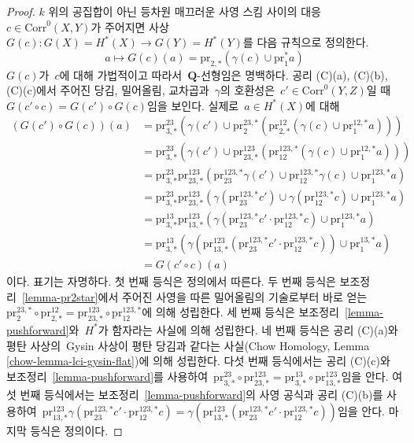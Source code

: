 \begin{proof}
\medskip\noindent
$k$ 위의 공집합이 아닌 등차원 매끄러운 사영 스킴 사이의 대응\ 
$c \in \text{Corr}^0(X, Y)$가 주어지면 사상\ 
$G(c) : G(X) = H^*(X) \to G(Y) = H^*(Y)$를 다음 규칙으로 정의한다.
$$
a \longmapsto
G(c)(a) = \text{pr}_{2, *}(\gamma(c) \cup \text{pr}_1^*a)
$$
$G(c)$가\  $c$에 대해 가법적이고 따라서\  $\mathbf{Q}$-선형임은 명백하다.
공리 (C)(a), (C)(b), (C)(c)에서 주어진 당김, 밀어올림, 교차곱과\ 
$\gamma$의 호환성은\  $c' \in \text{Corr}^0(Y, Z)$일 때\ 
$G(c' \circ c) = G(c') \circ G(c)$임을 보인다. 실제로\ 
$a \in H^*(X)$에 대해
\begin{align*}
(G(c') \circ G(c))(a)
& =
\text{pr}^{23}_{3, *}(\gamma(c') \cup
\text{pr}^{23, *}_2(\text{pr}^{12}_{2, *}(\gamma(c) \cup
\text{pr}^{12, *}_1a))) \\
& =
\text{pr}^{23}_{3, *}(\gamma(c') \cup
\text{pr}^{123}_{23, *}(\text{pr}^{123, *}_{12}(\gamma(c) \cup
\text{pr}^{12, *}_1 a))) \\
& =
\text{pr}^{23}_{3, *}
\text{pr}^{123}_{23, *}(
\text{pr}^{123, *}_{23}\gamma(c') \cup
\text{pr}^{123, *}_{12}\gamma(c) \cup
\text{pr}^{123, *}_1 a) \\
& =
\text{pr}^{23}_{3, *}
\text{pr}^{123}_{23, *}(
\gamma(\text{pr}^{123, *}_{23}c') \cup
\gamma(\text{pr}^{123, *}_{12}c) \cup
\text{pr}^{123, *}_1 a) \\
& =
\text{pr}^{13}_{3, *}
\text{pr}^{123}_{13, *}(
\gamma(\text{pr}^{123, *}_{23}c' \cdot \text{pr}^{123, *}_{12}c) \cup
\text{pr}^{123, *}_1 a) \\
& =
\text{pr}^{13}_{3, *}(
\gamma(\text{pr}^{123}_{13, *}(\text{pr}^{123, *}_{23}c' \cdot
\text{pr}^{123, *}_{12}c)) \cup
\text{pr}^{13, *}_1 a) \\
& =
G(c' \circ c)(a)
\end{align*}
이다. 표기는 자명하다. 첫 번째 등식은 정의에서 따른다. 두 번째 등식은
보조정리\  \ref{lemma-pr2star}에서 주어진 사영을 따른 밀어올림의 기술로부터
바로 얻는\ 
$\text{pr}^{23, *}_2 \circ \text{pr}^{12}_{2, *} =
\text{pr}^{123}_{23, *} \circ \text{pr}^{123, *}_{12}$에 의해 성립한다.
세 번째 등식은 보조정리\  \ref{lemma-pushforward}와\  $H^*$가 함자라는
사실에 의해 성립한다. 네 번째 등식은 공리 (C)(a)와 평탄 사상의\ 
Gysin 사상이 평탄 당김과 같다는 사실(Chow Homology, Lemma
\ref{chow-lemma-lci-gysin-flat})에 의해 성립한다. 다섯 번째 등식에서는
공리 (C)(c)와 보조정리\  \ref{lemma-pushforward}를 사용하여\ 
$\text{pr}^{23}_{3, *} \circ \text{pr}^{123}_{23, *} =
\text{pr}^{13}_{3, *} \circ \text{pr}^{123}_{13, *}$임을 안다.
여섯 번째 등식에서는 보조정리\  \ref{lemma-pushforward}의 사영 공식과
공리 (C)(b)를 사용하여\  $
\text{pr}^{123}_{13, *}
\gamma(\text{pr}^{123, *}_{23}c' \cdot \text{pr}^{123, *}_{12}c) =
\gamma(\text{pr}^{123}_{13, *}(
\text{pr}^{123, *}_{23}c' \cdot \text{pr}^{123, *}_{12}c))$임을 안다.
마지막 등식은 정의이다.


\end{proof}
